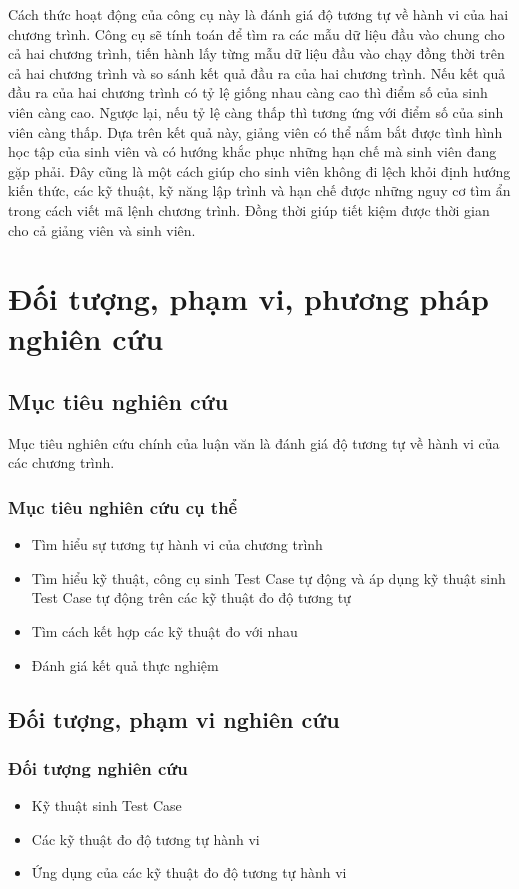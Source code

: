 Cách thức hoạt động của công cụ này là đánh giá độ tương tự về hành vi
của hai chương trình. Công cụ sẽ tính toán để tìm ra các mẫu dữ liệu
đầu vào chung cho cả hai chương trình, tiến hành lấy từng mẫu dữ liệu
đầu vào chạy đồng thời trên cả hai chương trình và so sánh kết quả đầu
ra của hai chương trình. Nếu kết quả đầu ra của hai chương trình có tỷ
lệ giống nhau càng cao thì điểm số của sinh viên càng cao. Ngược lại,
nếu tỷ lệ càng thấp thì tương ứng với điểm số của sinh viên càng
thấp. Dựa trên kết quả này, giảng viên có thể nắm bắt được tình hình
học tập của sinh viên và có hướng khắc phục những hạn chế mà sinh viên
đang gặp phải. Đây cũng là một cách giúp cho sinh viên không đi lệch
khỏi định hướng kiến thức, các kỹ thuật, kỹ năng lập trình và hạn chế
được những nguy cơ tìm ẩn trong cách viết mã lệnh chương trình. Đồng
thời giúp tiết kiệm được thời gian cho cả giảng viên và sinh viên.

\section{Đối tượng, phạm vi, phương pháp nghiên cứu}
\subsection*{Mục tiêu nghiên cứu}

Mục tiêu nghiên cứu chính của luận văn là đánh giá độ tương tự về hành
vi của các chương trình.
		
\subsubsection*{Mục tiêu nghiên cứu cụ thể}
\begin{itemize}
\item Tìm hiểu sự tương tự hành vi của chương trình
\item Tìm hiểu kỹ thuật, công cụ sinh Test Case tự động và áp dụng kỹ
  thuật sinh Test Case tự động trên các kỹ thuật đo độ tương tự
\item Tìm cách kết hợp các kỹ thuật đo với nhau
\item Đánh giá kết quả thực nghiệm
\end{itemize}

\subsection*{Đối tượng, phạm vi nghiên cứu}	
\subsubsection*{Đối tượng nghiên cứu}
\begin{itemize}
\item Kỹ thuật sinh Test Case
\item Các kỹ thuật đo độ tương tự hành vi
\item Ứng dụng của các kỹ thuật đo độ tương tự hành vi
\end{itemize}
	
